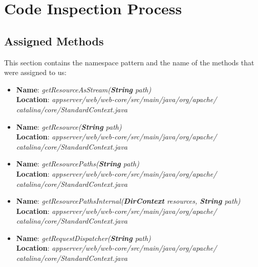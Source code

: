 \chapter{Code Inspection Process} \label{chap2}

\section{Assigned Methods}
This section contains the namespace pattern and the name of the methods that were assigned to us:
\begin{itemize}
	\item \textbf{Name}: \textit{getResourceAsStream(\textbf{String} path)}\\
		\textbf{Location}: \textit{appserver/web/web-core/src/main/java/org/apache/\\catalina/core/StandardContext.java}
	\item \textbf{Name}: \textit{getResource(\textbf{String} path)}\\
		\textbf{Location}: \textit{appserver/web/web-core/src/main/java/org/apache/\\catalina/core/StandardContext.java}
	\item \textbf{Name}: \textit{getResourcePaths(\textbf{String} path)}\\
		\textbf{Location}: \textit{appserver/web/web-core/src/main/java/org/apache/\\catalina/core/StandardContext.java}
	\item \textbf{Name}: \textit{getResourcePathsInternal(\textbf{DirContext} resources, \textbf{String} path)}\\
		\textbf{Location}: \textit{appserver/web/web-core/src/main/java/org/apache/\\catalina/core/StandardContext.java}
	\item \textbf{Name}: \textit{getRequestDispatcher(\textbf{String} path)}\\
		\textbf{Location}: \textit{appserver/web/web-core/src/main/java/org/apache/\\catalina/core/StandardContext.java}
\end{itemize}

